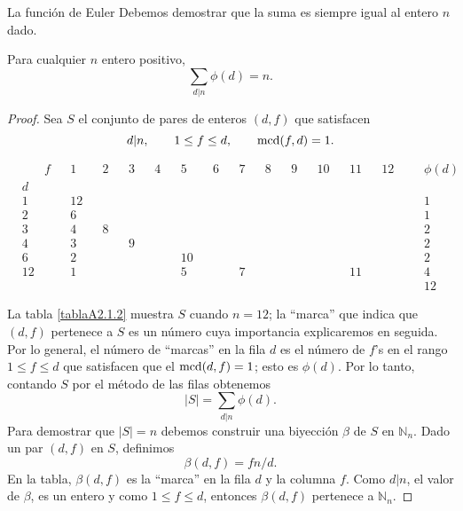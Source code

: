 \begin{section}{La función de Euler}
Debemos demostrar que la suma es siempre igual al entero $n$ dado.


\begin{teorema}\label{tA2.1b} Para cualquier $n$ entero positivo,
$$
\sum_{d|n} \phi(d)=n.
$$
\end{teorema}
\begin{proof} Sea $S$ el conjunto de pares de enteros $(d,f)$ que
satisfacen
$$
d|n, \qquad 1\le f \le d, \qquad \operatorname{mcd}(f,d)=1.
$$


\begin{table}


\begin{align*}
&  &f &&1  &&2 &&3 &&4 &&5  &&6 &&7 &&8 &&9 &&10 &&11 &&12 && &\phi(d)\\
&d &  &&   &&  &&  &&  &&   &&  &&  &&  &&  &&   &&   &&   && &   \\
&1 &  &&12 &&  &&  &&  &&   &&  &&  &&  &&  &&   &&   &&   && &1  \\
&2 &  &&6  &&  &&  &&  &&   &&  &&  &&  &&  &&   &&   &&   && &1  \\
&3 &  &&4  &&8 &&  &&  &&   &&  &&  &&  &&  &&   &&   &&   && &2  \\
&4 &  &&3  &&  &&9 &&  &&   &&  &&  &&  &&  &&   &&   &&   && &2  \\
&6 &  &&2  &&  &&  &&  &&10 &&  &&  &&  &&  &&   &&   &&   && &2  \\
&12&  &&1  &&  &&  &&  &&5  &&  &&7 &&  &&  &&   &&11 &&   && &4  \\
&  &  &&   &&  &&  &&  &&   &&  &&  &&  &&  &&   &&   &&   && &12
\end{align*}

\caption{} \label{tablaA2.1.2}
\end{table}


La tabla \ref{tablaA2.1.2} muestra $S$ cuando $n=12$; la ``marca''
que indica que $(d,f)$ pertenece a $S$ es un número cuya
importancia explicaremos en seguida. Por lo general, el número de
``marcas'' en la fila $d$ es el número de $f$'s en el rango $1\le
f\le d$ que satisfacen que el $\operatorname{mcd}(d,f)=1$; esto es $\phi(d)$.
Por lo tanto, contando $S$ por el método de las filas obtenemos
$$
|S| = \sum_{d|n} \phi(d).
$$
Para demostrar que $|S|=n$ debemos construir una biyección $\beta$
de $S$ en $\mathbb N_n$. Dado un par $(d,f)$ en $S$, definimos
$$
\beta(d,f) = f n/d.
$$
En la tabla, $\beta(d,f)$ es la ``marca'' en la fila $d$ y la
columna $f$. Como $d| n$, el valor de $\beta$, es un entero y como
$1\le f\le d$, entonces $\beta(d,f)$ pertenece a $\mathbb N_n$.


\end{proof}
\end{section}
